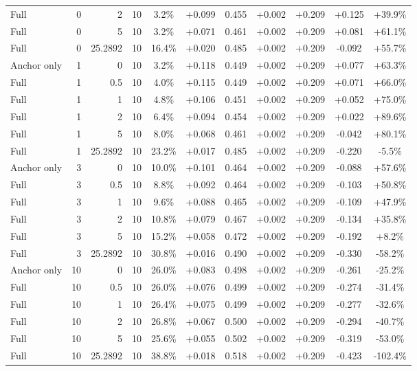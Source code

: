 \begin{table}[htbp]
\begin{tabular}{lrrrccccccc}
Full & 0 & 2 & 10 & 3.2\% & +0.099 & 0.455 & +0.002 & +0.209 & +0.125 & +39.9\% \\
Full & 0 & 5 & 10 & 3.2\% & +0.071 & 0.461 & +0.002 & +0.209 & +0.081 & +61.1\% \\
Full & 0 & 25.2892 & 10 & 16.4\% & +0.020 & 0.485 & +0.002 & +0.209 & -0.092 & +55.7\% \\
Anchor only & 1 & 0 & 10 & 3.2\% & +0.118 & 0.449 & +0.002 & +0.209 & +0.077 & +63.3\% \\
Full & 1 & 0.5 & 10 & 4.0\% & +0.115 & 0.449 & +0.002 & +0.209 & +0.071 & +66.0\% \\
Full & 1 & 1 & 10 & 4.8\% & +0.106 & 0.451 & +0.002 & +0.209 & +0.052 & +75.0\% \\
Full & 1 & 2 & 10 & 6.4\% & +0.094 & 0.454 & +0.002 & +0.209 & +0.022 & +89.6\% \\
Full & 1 & 5 & 10 & 8.0\% & +0.068 & 0.461 & +0.002 & +0.209 & -0.042 & +80.1\% \\
Full & 1 & 25.2892 & 10 & 23.2\% & +0.017 & 0.485 & +0.002 & +0.209 & -0.220 & -5.5\% \\
Anchor only & 3 & 0 & 10 & 10.0\% & +0.101 & 0.464 & +0.002 & +0.209 & -0.088 & +57.6\% \\
Full & 3 & 0.5 & 10 & 8.8\% & +0.092 & 0.464 & +0.002 & +0.209 & -0.103 & +50.8\% \\
Full & 3 & 1 & 10 & 9.6\% & +0.088 & 0.465 & +0.002 & +0.209 & -0.109 & +47.9\% \\
Full & 3 & 2 & 10 & 10.8\% & +0.079 & 0.467 & +0.002 & +0.209 & -0.134 & +35.8\% \\
Full & 3 & 5 & 10 & 15.2\% & +0.058 & 0.472 & +0.002 & +0.209 & -0.192 & +8.2\% \\
Full & 3 & 25.2892 & 10 & 30.8\% & +0.016 & 0.490 & +0.002 & +0.209 & -0.330 & -58.2\% \\
Anchor only & 10 & 0 & 10 & 26.0\% & +0.083 & 0.498 & +0.002 & +0.209 & -0.261 & -25.2\% \\
Full & 10 & 0.5 & 10 & 26.0\% & +0.076 & 0.499 & +0.002 & +0.209 & -0.274 & -31.4\% \\
Full & 10 & 1 & 10 & 26.4\% & +0.075 & 0.499 & +0.002 & +0.209 & -0.277 & -32.6\% \\
Full & 10 & 2 & 10 & 26.8\% & +0.067 & 0.500 & +0.002 & +0.209 & -0.294 & -40.7\% \\
Full & 10 & 5 & 10 & 25.6\% & +0.055 & 0.502 & +0.002 & +0.209 & -0.319 & -53.0\% \\
Full & 10 & 25.2892 & 10 & 38.8\% & +0.018 & 0.518 & +0.002 & +0.209 & -0.423 & -102.4\% \\

\end{tabular}
\end{table}
